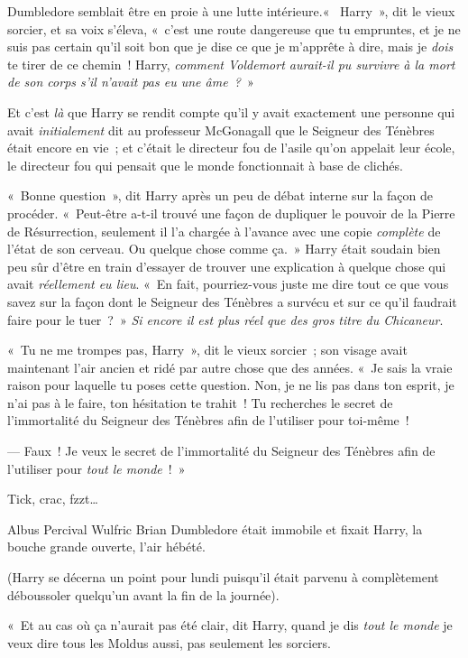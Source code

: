 Dumbledore semblait être en proie à une lutte intérieure.«~ Harry~», dit le vieux sorcier, et sa voix s'éleva, «~c'est une route dangereuse que tu empruntes, et je ne suis pas certain qu'il soit bon que je dise ce que je m'apprête à dire, mais je \emph{dois} te tirer de ce chemin~! Harry, \emph{comment Voldemort aurait-il pu survivre à la mort de son corps s'il n'avait pas eu une âme~?}~»

Et c'est \emph{là} que Harry se rendit compte qu'il y avait exactement une personne qui avait \emph{initialement} dit au professeur McGonagall que le Seigneur des Ténèbres était encore en vie~; et c'était le directeur fou de l'asile qu'on appelait leur école, le directeur fou qui pensait que le monde fonctionnait à base de clichés.

«~Bonne question~», dit Harry après un peu de débat interne sur la façon de procéder. «~Peut-être a-t-il trouvé une façon de dupliquer le pouvoir de la Pierre de Résurrection, seulement il l'a chargée à l'avance avec une copie \emph{complète} de l'état de son cerveau. Ou quelque chose comme ça.~» Harry était soudain bien peu sûr d'être en train d'essayer de trouver une explication à quelque chose qui avait \emph{réellement eu lieu}. «~En fait, pourriez-vous juste me dire tout ce que vous savez sur la façon dont le Seigneur des Ténèbres a survécu et sur ce qu'il faudrait faire pour le tuer~?~» \emph{Si encore il est plus réel que des gros titre du Chicaneur}.

«~Tu ne me trompes pas, Harry~», dit le vieux sorcier~; son visage avait maintenant l'air ancien et ridé par autre chose que des années. «~Je sais la vraie raison pour laquelle tu poses cette question. Non, je ne lis pas dans ton esprit, je n'ai pas à le faire, ton hésitation te trahit~! Tu recherches le secret de l'immortalité du Seigneur des Ténèbres afin de l'utiliser pour toi-même~!

--- Faux~! Je veux le secret de l'immortalité du Seigneur des Ténèbres afin de l'utiliser pour \emph{tout le monde}~!~»

\later

Tick, crac, fzzt…

Albus Percival Wulfric Brian Dumbledore était immobile et fixait Harry, la bouche grande ouverte, l'air hébété.

(Harry se décerna un point pour lundi puisqu'il était parvenu à complètement déboussoler quelqu'un avant la fin de la journée).

«~Et au cas où ça n'aurait pas été clair, dit Harry, quand je dis \emph{tout le monde} je veux dire tous les Moldus aussi, pas seulement les sorciers.

